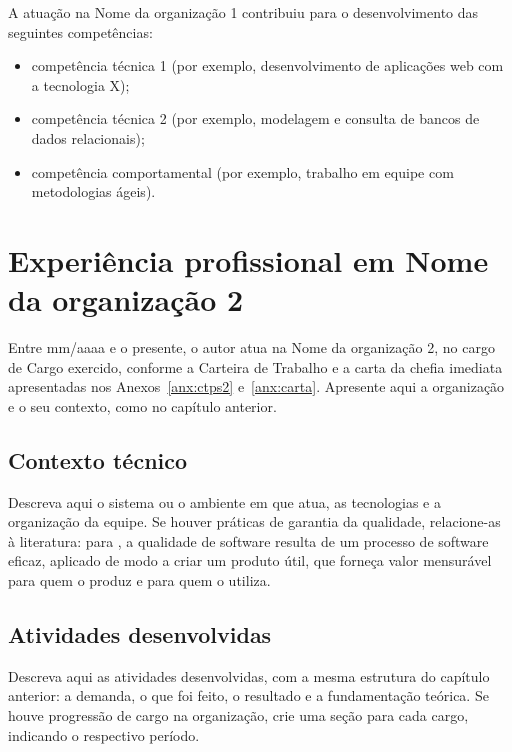 \documentclass[memorial,capa]{texifsap}
\begin{document}

A atuação na Nome da organização 1 contribuiu para o desenvolvimento das
seguintes competências:
\begin{itemize}
\item competência técnica 1 (por exemplo, desenvolvimento de aplicações
  web com a tecnologia X);
\item competência técnica 2 (por exemplo, modelagem e consulta de bancos
  de dados relacionais);
\item competência comportamental (por exemplo, trabalho em equipe com
  metodologias ágeis).
\end{itemize}

\chapter{Experiência profissional em Nome da organização 2}
\label{cap:experiencia2}

Entre mm/aaaa e o presente, o autor atua na Nome da organização 2, no
cargo de Cargo exercido, conforme a Carteira de Trabalho e a carta da
chefia imediata apresentadas nos Anexos~\ref{anx:ctps2}
e~\ref{anx:carta}. Apresente aqui a organização e o seu contexto, como
no capítulo anterior.

\section{Contexto técnico}

Descreva aqui o sistema ou o ambiente em que atua, as tecnologias e a
organização da equipe. Se houver práticas de garantia da qualidade,
relacione-as à literatura: para \citet{Pressman:2021}, a qualidade de
software resulta de um processo de software eficaz, aplicado de modo a
criar um produto útil, que forneça valor mensurável para quem o produz e
para quem o utiliza.

\section{Atividades desenvolvidas}
\label{sec:atividades2}

Descreva aqui as atividades desenvolvidas, com a mesma estrutura do
capítulo anterior: a demanda, o que foi feito, o resultado e a
fundamentação teórica. Se houve progressão de cargo na organização,
crie uma seção para cada cargo, indicando o respectivo período.
\end{document}
